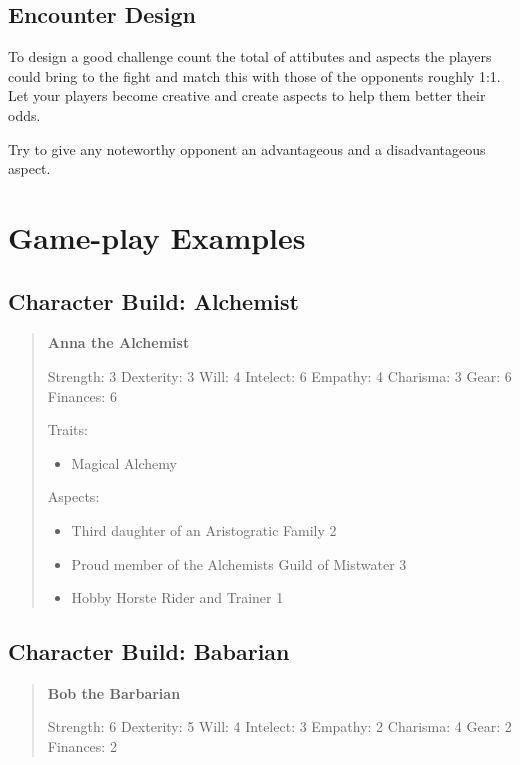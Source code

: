 \documentclass[11pt]{article}
\begin{document}
{\subsection{Encounter Design}
\label{sec:orgb794839}

To design a good challenge count the total of attibutes and aspects the players could bring to the fight and match this with those of the opponents roughly 1:1. Let your players become creative and create aspects to help them better their odds.

Try to give any noteworthy opponent an advantageous and a disadvantageous aspect.

\section{Game-play Examples}
\label{sec:org2b4b8dc}
\subsection{Character Build: Alchemist}
\label{sec:orgde960cc}

\begin{quote}
\textbf{Anna the Alchemist}

Strength: 3
Dexterity: 3
Will: 4
Intelect: 6
Empathy: 4
Charisma: 3
Gear: 6
Finances: 6

Traits:
\begin{itemize}
\item Magical Alchemy
\end{itemize}

Aspects:
\begin{itemize}
\item Third daughter of an Aristogratic Family 2
\item Proud member of the Alchemists Guild of Mistwater 3
\item Hobby Horste Rider and Trainer 1
\end{itemize}
\end{quote}

\subsection{Character Build: Babarian}
\label{sec:org66f0655}

\begin{quote}
\textbf{Bob the Barbarian}

Strength: 6
Dexterity: 5
Will: 4
Intelect: 3
Empathy: 2
Charisma: 4
Gear: 2
Finances: 2


\end{quote}}
\end{document}
